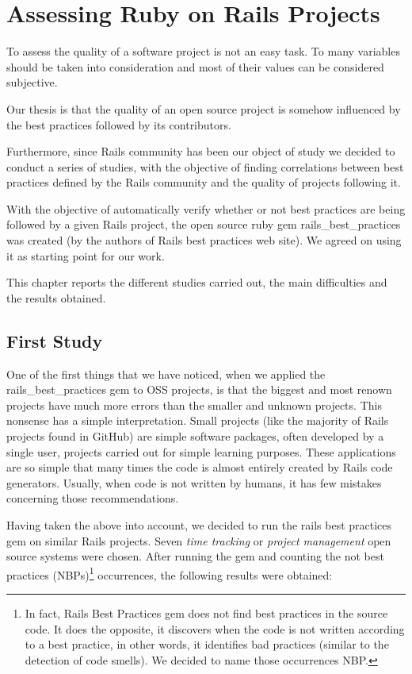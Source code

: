 \thispagestyle{empty}
\chapter{Assessing Ruby on Rails Projects}\label{chap:assissing_ror}

To assess the quality of a software project is not an easy task.
To many variables should be taken into consideration and most of their values can be considered subjective.

Our thesis is that the quality of an open source project is somehow influenced by the best practices followed 
by its contributors.

Furthermore, since Rails community has been our object of study we decided to conduct a series of studies, 
with the objective of finding correlations between best practices defined by the Rails community and
the quality of projects following it.

With the objective of automatically verify whether or not best practices are being followed by
a given Rails project, the open source ruby gem rails\_best\_practices 
was created (by the authors of Rails best practices web site).
We agreed on using it as starting point for our work.

This chapter reports the different studies carried out, the main difficulties and the results obtained.



\section{First Study}\label{subsec:first_study}
One of the first things that we have noticed, when we applied the rails\_best\_practices gem to OSS projects,
is that the biggest and most renown projects have much more errors than the smaller and unknown projects.
This nonsense has a simple  interpretation.
Small projects (like the majority of Rails projects found in GitHub) are simple software packages,
often developed by a single user, projects carried out for simple learning purposes.
These applications are so simple that many times the code is almost entirely created by Rails code generators.
Usually, when code is not written by humans, it has few mistakes concerning those recommendations.

Having taken the above into account, we decided to run the rails best practices gem on similar Rails projects.
Seven \emph{time tracking} or \emph{project management} open source systems were chosen.
After running the gem and counting the
\textsf{not best practices (NBPs)}\footnote{In fact, Rails Best Practices gem does not find best practices in the source code.
  It does the opposite, it discovers when the code is not written according to a best practice, in other words, 
  it identifies bad practices (similar to the detection of code smells).
  We decided to name those occurrences NBP.
}
occurrences, the following results were obtained:

